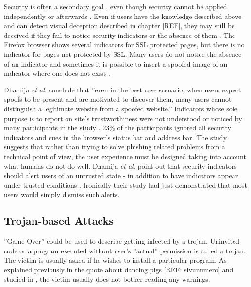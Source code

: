 \documentclass{tktltiki}
\begin{document}
    Security is often a secondary goal \cite{why_phishing_works_06}, even though security cannot be applied independently or afterwards \cite{schneier_secrets_and_lies_2000, lampson_distributed_1992}. Even if users have the knowledge described above and can detect visual deception described in chapter [REF], they may still be deceived if they fail to notice security indicators or the absence of them \cite{why_phishing_works_06}. The Firefox browser shows several indicators for SSL protected pages, but there is no indicator for pages not protected by SSL. Many users do not notice the absence of an indicator and sometimes it is possible to insert a spoofed image of an indicator where one does not exist \cite{why_phishing_works_06}.
        
    Dhamija \emph{et al.} conclude \cite{why_phishing_works_06} that ''even in the best case scenario, when users expect spoofs to be present and are motivated to discover them, many users cannot distinguish a legitimate website from a spoofed website.'' Indicators whose sole purpose is to report on site's trustworthiness were not understood or noticed by many participants in the study \cite{why_phishing_works_06}. 23\% of the participants ignored all security indicators and cues in the browser's status bar and address bar. The study suggests that rather than trying to solve phishing related problems from a technical point of view, the user experience must be designed taking into account what humans do not do well. Dhamija \emph{et al.} point out that security indicators should alert users of an untrusted state - in addition to have indicators appear under trusted conditions \cite{why_phishing_works_06}. Ironically their study had just demonstrated that most users would simply dismiss such alerts.
        
      
    
\subsection{Trojan-based Attacks}

  ''Game Over'' could be used to describe getting infected by a trojan. Uninvited code or a program executed without user's ''actual'' permission is called a trojan. The victim is usually asked if he wishes to install a particular program. As explained previously in the quote about dancing pigs [REF: sivunumero] and studied in \cite{why_phishing_works_06}, the victim usually does not bother reading any warnings.
\end{document}
